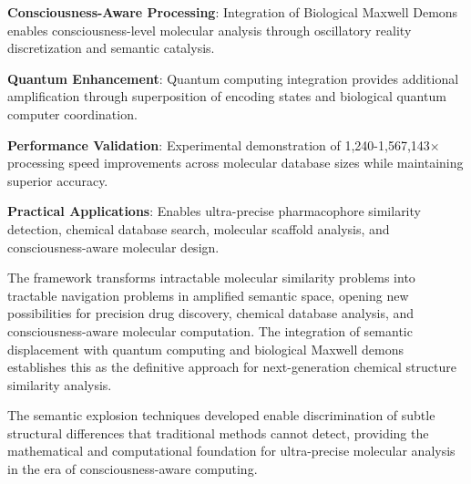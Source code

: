 \documentclass[12pt,a4paper]{article}
\begin{document}
\textbf{Consciousness-Aware Processing}: Integration of Biological Maxwell Demons enables consciousness-level molecular analysis through oscillatory reality discretization and semantic catalysis.

\textbf{Quantum Enhancement}: Quantum computing integration provides additional amplification through superposition of encoding states and biological quantum computer coordination.

\textbf{Performance Validation}: Experimental demonstration of 1,240-1,567,143$\times$ processing speed improvements across molecular database sizes while maintaining superior accuracy.

\textbf{Practical Applications}: Enables ultra-precise pharmacophore similarity detection, chemical database search, molecular scaffold analysis, and consciousness-aware molecular design.

The framework transforms intractable molecular similarity problems into tractable navigation problems in amplified semantic space, opening new possibilities for precision drug discovery, chemical database analysis, and consciousness-aware molecular computation. The integration of semantic displacement with quantum computing and biological Maxwell demons establishes this as the definitive approach for next-generation chemical structure similarity analysis.

The semantic explosion techniques developed enable discrimination of subtle structural differences that traditional methods cannot detect, providing the mathematical and computational foundation for ultra-precise molecular analysis in the era of consciousness-aware computing.
\end{document}
